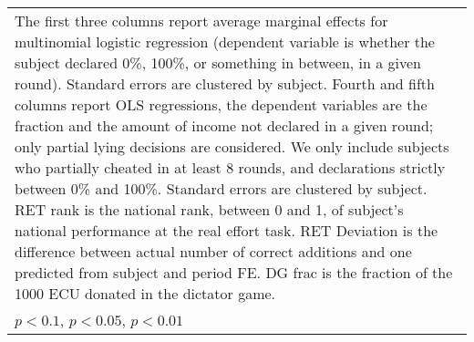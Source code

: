 \begin{tabular}{l|cccccc|cc|cc}
\hline\hline
\multicolumn{11}{p{18cm}}{\tiny The first three columns report average marginal effects for multinomial logistic regression (dependent variable is whether the subject declared 0\%, 100\%, or something in between, in a given round). Standard errors are clustered by subject. Fourth and fifth columns report OLS regressions, the dependent variables are the fraction and the amount of income not declared in a given round; only partial lying decisions are considered. We only include subjects who partially cheated in at least 8 rounds, and declarations strictly between 0\% and 100\%. Standard errors are clustered by subject. RET rank is the national rank, between 0 and 1, of subject's national performance at the real effort task. RET Deviation is the difference between actual number of correct additions and one predicted from subject and period FE. DG frac is the fraction of the 1000 ECU donated in the dictator game.}\\
\multicolumn{11}{l}{\tiny \sym{*} \(p<0.1\), \sym{**} \(p<0.05\), \sym{***} \(p<0.01\)}\\
\end{tabular}